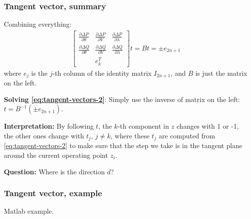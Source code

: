 \documentclass{beamer}
\begin{document}
\begin{frame}
  \frametitle{Tangent vector, summary}
Combining everything:
\begin{align}
  \label{eq:tangent-vectors-2}
  \begin{bmatrix}
  \frac{\partial \Delta P}{\partial \theta} & \frac{\partial \Delta P}{\partial V} & \frac{\partial \Delta P}{\partial \lambda} \\
  \frac{\partial \Delta Q}{\partial \theta} & \frac{\partial \Delta Q}{\partial V} & \frac{\partial \Delta Q}{\partial \lambda} \\
   & e_k^T & 
  \end{bmatrix} t = Bt = \pm e_{2n+1}
\end{align}
where $e_j$ is the $j$-th column of the identity matrix $I_{2n+1}$, and $B$ is just the matrix on the left.

\textbf{Solving \eqref{eq:tangent-vectors-2}}: Simply use the inverse of matrix on the left: $t = B^{-1} (\pm e_{2n+1})$.

\textbf{Interpretation:} By following $t$, the $k$-th component in $z$ changes with 1 or -1, the other ones change with $t_j$, $j \neq k$, where these $t_j$ are computed from \eqref{eq:tangent-vectors-2} to make sure that the step we take is in the tangent plane around the current operating point $z_i$.

\textbf{Question:} Where is the direction $d$?  
\end{frame}

\begin{frame}
  \frametitle{Tangent vector, example}
  Matlab example.
\end{frame}
\end{document}
